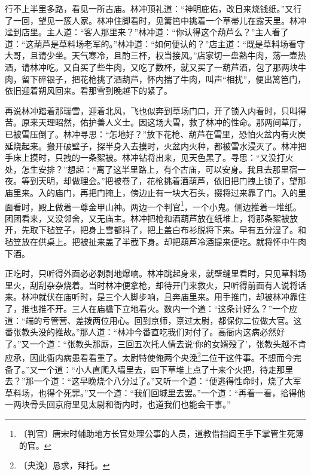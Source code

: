 \documentclass[12pt,UTF-8,openany]{ctexbook}
\begin{document}
\begin{normalsize}
    行不上半里多路，看见一所古庙。林冲顶礼道：“神明庇佑，改日来烧钱纸。”又行了一回，望见一簇人家。林冲住脚看时，见篱笆中挑着一个草帚儿在露天里。林冲迳到店里。主人道：“客人那里来？”林冲道：“你认得这个葫芦么？”主人看了道：“这葫芦是草料场老军的。”林冲道：“如何便认的？”店主道：“既是草料场看守大哥，且请少坐。天气寒冷，且酌三杯，权当接风。”店家切一盘熟牛肉，荡一壶热酒，请林冲吃。又自买了些牛肉，又吃了数杯，就又买了一葫芦酒，包了那两块牛肉，留下碎银子，把花枪挑了酒葫芦，怀内揣了牛肉，叫声“相扰”，便出篱笆门，依旧迎着朔风回来。看那雪到晚越下的紧了。
    
    再说林冲踏着那瑞雪，迎着北风，飞也似奔到草场门口，开了锁入内看时，只叫得苦。原来天理昭然，佑护善人义士。因这场大雪，救了林冲的性命。那两间草厅，已被雪压倒了。林冲寻思：“怎地好？”放下花枪、葫芦在雪里，恐怕火盆内有火炭延烧起来。搬开破壁子，探半身入去摸时，火盆内火种，都被雪水浸灭了。林冲把手床上摸时，只拽的一条絮被。林冲钻将出来，见天色黑了。寻思：“又没打火处，怎生安排？”想起：“离了这半里路上，有个古庙，可以安身。我且去那里宿一夜。等到天明，却做理会。”把被卷了，花枪挑着酒葫芦，依旧把门拽上锁了，望那庙里来。入的庙门，再把门掩上，傍边止有一块大石头，掇将过来靠了门。入的里面看时，殿上做着一尊金甲山神。两边一个判官\footnote{〔判官〕唐宋时辅助地方长官处理公事的人员，道教借指阎王手下掌管生死簿的官。}，一个小鬼。侧边推着一堆纸。团团看来，又没邻舍，又无庙主。林冲把枪和酒葫芦放在纸堆上，将那条絮被放开，先取下毡笠子，把身上雪都抖了，把上盖白布衫脱将下来。早有五分湿了。和毡笠放在供桌上。把被扯来盖了半截下身。却把葫芦冷酒提来便吃。就将怀中牛肉下酒。
    
    正吃时，只听得外面必必剥剥地爆响。林冲跳起身来，就壁缝里看时，只见草料场里火，刮刮杂杂烧着。当时林冲便拿枪，却待开门来救火，只听得前面有人说将话来。林冲就伏在庙听时，是三个人脚步响，且奔庙里来。用手推门，却被林冲靠住了，推也推不开。三人在庙檐下立地看火。数内一个道：“这条计好么？”一个应道：“端的亏管营、差拨两位用心。回到京师，禀过太尉，都保你二位做大官。这番张教头没的推故。”那人道：“林冲今番直吃我们对付了。高衙内这病必然好了。”又一个道：“张教头那厮，三回五次托人情去说‘你的女婿殁了’，张教头越不肯应承，因此衙内病患看看重了。太尉特使俺两个央浼\footnote{〔央浼〕恳求，拜托。}二位干这件事。不想而今完备了。”又一个道：“小人直爬入墙里去，四下草堆上点了十来个火把，待走那里去？”那一个道：“这早晚烧个八分过了。”又听一个道：“便逃得性命时，烧了大军草料场，也得个死罪。”又一个道：“我们回城里去罢。”一个道：“再看一看，拾得他一两块骨头回京府里见太尉和衙内时，也道我们也能会干事。”
    

\end{normalsize}
\end{document}
